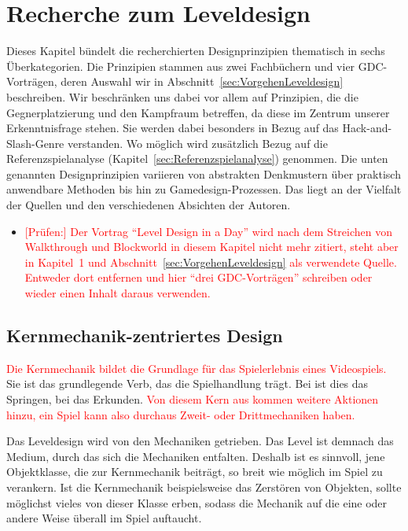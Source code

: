 \documentclass[../Main.tex]{subfiles}
\begin{document}
\section{Recherche zum Leveldesign} \label{sec:Leveldesign}
Dieses Kapitel bündelt die recherchierten Designprinzipien thematisch in sechs Überkategorien. Die Prinzipien stammen aus zwei Fachbüchern und vier GDC-Vorträgen, deren Auswahl wir in Abschnitt~\ref{sec:VorgehenLeveldesign} beschreiben. Wir beschränken uns dabei vor allem auf Prinzipien, die die Gegnerplatzierung und den Kampfraum betreffen, da diese im Zentrum unserer Erkenntnisfrage stehen. Sie werden dabei besonders in Bezug auf das Hack-and-Slash-Genre verstanden. Wo möglich wird zusätzlich Bezug auf die Referenzspielanalyse (Kapitel~\ref{sec:Referenzspielanalyse}) genommen. Die unten genannten Designprinzipien variieren von abstrakten Denkmustern über praktisch anwendbare Methoden bis hin zu Gamedesign-Prozessen. Das liegt an der Vielfalt der Quellen und den verschiedenen Absichten der Autoren.

\begin{itemize}[leftmargin=1.5cm]
    \item \textcolor{red}{[Prüfen:] Der Vortrag \enquote{Level Design in a Day} wird nach dem Streichen von Walkthrough und Blockworld in diesem Kapitel nicht mehr zitiert, steht aber in Kapitel~1 und Abschnitt~\ref{sec:VorgehenLeveldesign} als verwendete Quelle. Entweder dort entfernen und hier \enquote{drei GDC-Vorträgen} schreiben oder wieder einen Inhalt daraus verwenden.}
\end{itemize}

\subsection{Kernmechanik-zentriertes Design} \label{sec:Kernmechanik}

\textcolor{red}{Die Kernmechanik bildet die Grundlage für das Spielerlebnis eines Videospiels.} Sie ist das grundlegende Verb, das die Spielhandlung trägt.\autocite[110]{totten2014architectural} Bei  ist dies das Springen, bei  das Erkunden.\textcolor{red}{\autocites[110]{totten2014architectural}{nintendo_supermariobros_1985,nintendo_zelda_1986}} \textcolor{red}{Von diesem Kern aus kommen weitere Aktionen hinzu, ein Spiel kann also durchaus Zweit- oder Drittmechaniken haben.\autocite[110]{totten2014architectural}}

Das Leveldesign wird von den Mechaniken getrieben. Das Level ist demnach das Medium, durch das sich die Mechaniken entfalten.\autocite{gdc_tenprinciples2010} Deshalb ist es sinnvoll, jene Objektklasse, die zur Kernmechanik beiträgt, so breit wie möglich im Spiel zu verankern. Ist die Kernmechanik beispielsweise das Zerstören von Objekten, sollte möglichst vieles von dieser Klasse erben, sodass die Mechanik auf die eine oder andere Weise überall im Spiel auftaucht.\autocite{gdc_movingmountains2020}
\end{document}
